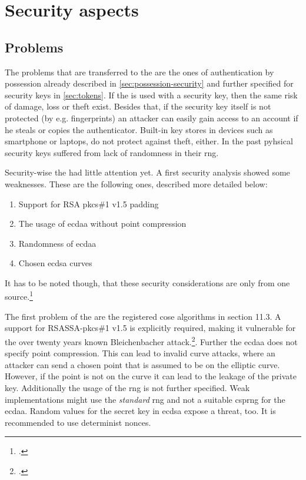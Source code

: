 \section{Security aspects}


\subsection{Problems}

The problems that are transferred to the \wa{} are the ones of authentication by possession already described in \autoref{sec:possession-security} and further specified for security keys in \autoref{sec:tokens}. If the \wa{} is used with a security key, then the same risk of damage, loss or theft exist. Besides that, if the security key itself is not protected (by e.g. fingerprints) an attacker can easily gain access to an account if he steals or copies the authenticator. Built-in key stores in devices such as smartphone or laptops, do not protect against theft, either. In the past pyhsical security keys suffered from lack of randomness in their \gls{rng}.

Security-wise the \wa{} had little attention yet. A first security analysis showed some weaknesses. These are the following ones, described more detailed below:

\begin{enumerate}
	\item Support for RSA \gls{pkcs}\#1 v1.5 padding
	\item The usage of \gls{ecdaa} without point compression
	\item Randomness of \gls{ecdaa}
	\item Chosen \gls{ecdsa} curves
\end{enumerate}

It has to be noted though, that these security considerations are only from one source.\footcite[See][]{paragon-webauth}

The first problem of the \wa{} are the registered \gls{cose} algorithms in section 11.3. A support for RSASSA-\gls{pkcs}\#1 v1.5 is explicitly required, making it vulnerable for the over twenty years known \frqq Bleichenbacher attack\flqq.\footcites[See][]{10.1007/BFb0055716}. Further the \gls{ecdaa} does not specify point compression. This can lead to invalid curve attacks, where an attacker can send a chosen point that is assumed to be on the elliptic curve. However, if the point is not on the curve it can lead to the leakage of the private key. Additionally the usage of the \gls{rng} is not further specified. Weak implementations might use the \textit{standard} \gls{rng} and not a suitable \gls{csprng} for the \gls{ecdaa}. Random values for the secret key in \gls{ecdsa} expose a threat, too. It is recommended to use determinist \glspl{nonce}.

